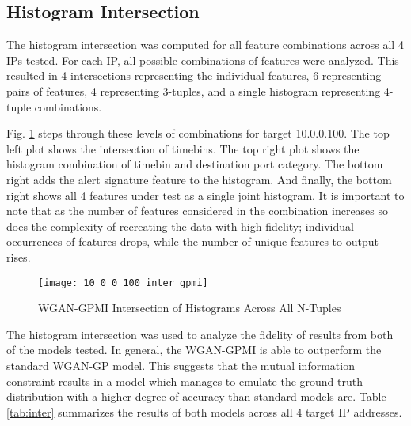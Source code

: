\subsection{Histogram Intersection}
\label{sec:inter}

The histogram intersection was computed for all feature combinations across all 4 IPs tested. For each IP, all possible combinations of features were analyzed. This resulted in 4 intersections representing the individual features, 6 representing pairs of features, 4 representing 3-tuples, and a single histogram representing 4-tuple combinations.

Fig. \ref{fig:inter} steps through these levels of combinations for target 10.0.0.100. The top left plot shows the intersection of timebins. The top right plot shows the histogram combination of timebin and destination port category. The bottom right adds the alert signature feature to the histogram. And finally, the bottom right shows all 4 features under test as a single joint histogram. It is important to note that as the number of features considered in the combination increases so does the complexity of recreating the data with high fidelity; individual occurrences of features drops, while the number of unique features to output rises.


\begin{figure}[!htbp]
	\centering
	\texttt{[image: 10\_0\_0\_100\_inter\_gpmi]}
	\caption{
		WGAN-GPMI Intersection of Histograms Across All N-Tuples
	}
	\label{fig:inter}
\end{figure}

The histogram intersection was used to analyze the fidelity of results from both of the models tested. In general, the WGAN-GPMI is able to outperform the standard WGAN-GP model. This suggests that the mutual information constraint results in a model which manages to emulate the ground truth distribution with a higher degree of accuracy than standard models are. Table \ref{tab:inter} summarizes the results of both models across all 4 target IP addresses.

